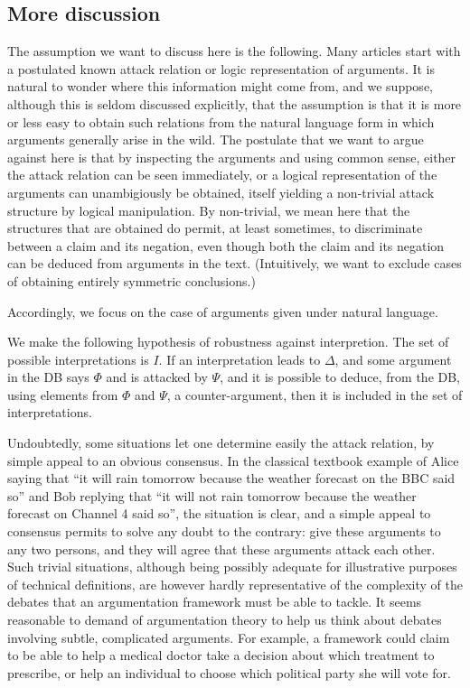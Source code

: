 \documentclass[version=3.21, pagesize, twoside=off, bibliography=totoc, DIV=calc, fontsize=12pt, a4paper, french, english]{scrartcl}
\begin{document}
\subsection{More discussion}

The assumption we want to discuss here is the following.
Many articles start with a postulated known attack relation or logic representation of arguments. It is natural to wonder where this information might come from, and we suppose, although this is seldom discussed explicitly, that the assumption is that it is more or less easy to obtain such relations from the natural language form in which arguments generally arise in the wild. 
The postulate that we want to argue against here is that by inspecting the arguments and using common sense, either the attack relation can be seen immediately, or a logical representation of the arguments can unambigiously be obtained, itself yielding a non-trivial attack structure by logical manipulation.
By non-trivial, we mean here that the structures that are obtained do permit, at least sometimes, to discriminate between a claim and its negation, even though both the claim and its negation can be deduced from arguments in the text. (Intuitively, we want to exclude cases of obtaining entirely symmetric conclusions.)

Accordingly, we focus on the case of arguments given under natural language. 

We make the following hypothesis of robustness against interpretion. The set of possible interpretations is $I$. If an interpretation leads to $\Delta$, and some argument in the DB says $\Phi$ and is attacked by $\Psi$, and it is possible to deduce, from the DB, using elements from $\Phi$ and $\Psi$, a counter-argument, then it is included in the set of interpretations.

Undoubtedly, some situations let one determine easily the attack relation, by simple appeal to an obvious consensus. In the classical textbook example of Alice saying that “it will rain tomorrow because the weather forecast on the BBC said so” and Bob replying that “it will not rain tomorrow because the weather forecast on Channel 4 said so”, the situation is clear, and a simple appeal to consensus permits to solve any doubt to the contrary: give these arguments to any two persons, and they will agree that these arguments attack each other. Such trivial situations, although being possibly adequate for illustrative purposes of technical definitions, are however hardly representative of the complexity of the debates that an argumentation framework must be able to tackle. It seems reasonable to demand of argumentation theory to help us think about debates involving subtle, complicated arguments. For example, a framework could claim to be able to help a medical doctor take a decision about which treatment to prescribe, or help an individual to choose which political party she will vote for.
\end{document}
